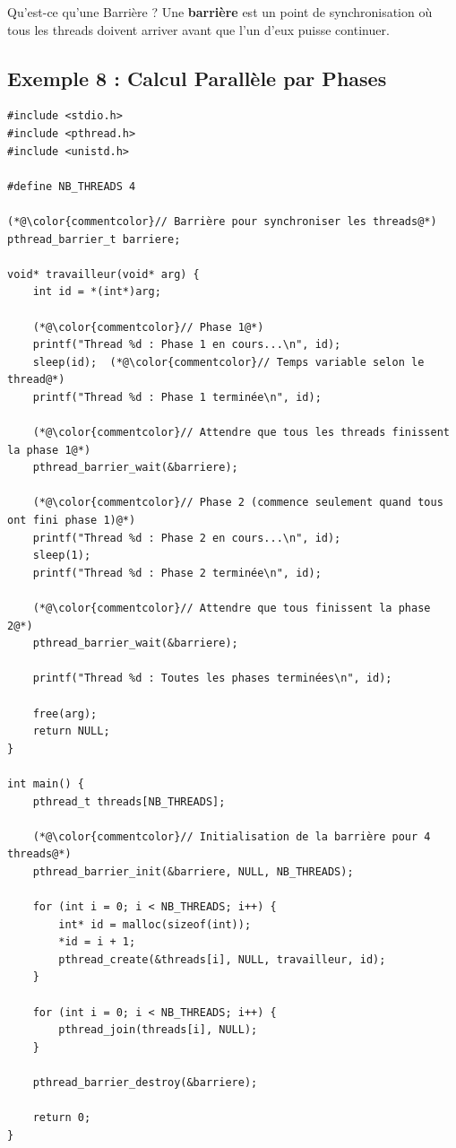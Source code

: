 \documentclass[11pt,a4paper]{article}
\begin{document}
\begin{definitionbox}{Qu'est-ce qu'une Barrière ?}
Une \textbf{barrière} est un point de synchronisation où tous les threads doivent arriver avant que l'un d'eux puisse continuer.
\end{definitionbox}

\subsection{Exemple 8 : Calcul Parallèle par Phases}

\begin{lstlisting}[caption={Synchronisation avec barrière}]
#include <stdio.h>
#include <pthread.h>
#include <unistd.h>

#define NB_THREADS 4

(*@\color{commentcolor}// Barrière pour synchroniser les threads@*)
pthread_barrier_t barriere;

void* travailleur(void* arg) {
    int id = *(int*)arg;
    
    (*@\color{commentcolor}// Phase 1@*)
    printf("Thread %d : Phase 1 en cours...\n", id);
    sleep(id);  (*@\color{commentcolor}// Temps variable selon le thread@*)
    printf("Thread %d : Phase 1 terminée\n", id);
    
    (*@\color{commentcolor}// Attendre que tous les threads finissent la phase 1@*)
    pthread_barrier_wait(&barriere);
    
    (*@\color{commentcolor}// Phase 2 (commence seulement quand tous ont fini phase 1)@*)
    printf("Thread %d : Phase 2 en cours...\n", id);
    sleep(1);
    printf("Thread %d : Phase 2 terminée\n", id);
    
    (*@\color{commentcolor}// Attendre que tous finissent la phase 2@*)
    pthread_barrier_wait(&barriere);
    
    printf("Thread %d : Toutes les phases terminées\n", id);
    
    free(arg);
    return NULL;
}

int main() {
    pthread_t threads[NB_THREADS];
    
    (*@\color{commentcolor}// Initialisation de la barrière pour 4 threads@*)
    pthread_barrier_init(&barriere, NULL, NB_THREADS);
    
    for (int i = 0; i < NB_THREADS; i++) {
        int* id = malloc(sizeof(int));
        *id = i + 1;
        pthread_create(&threads[i], NULL, travailleur, id);
    }
    
    for (int i = 0; i < NB_THREADS; i++) {
        pthread_join(threads[i], NULL);
    }
    
    pthread_barrier_destroy(&barriere);
    
    return 0;
}
\end{lstlisting}
\end{document}
